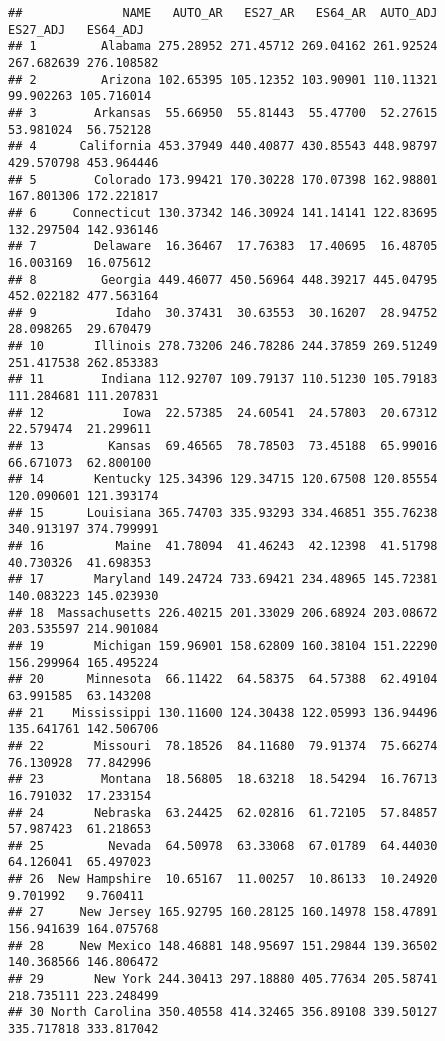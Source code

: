 \documentclass[
]{article}
\begin{document}
\begin{verbatim}
##              NAME   AUTO_AR   ES27_AR   ES64_AR  AUTO_ADJ   ES27_ADJ   ES64_ADJ
## 1         Alabama 275.28952 271.45712 269.04162 261.92524 267.682639 276.108582
## 2         Arizona 102.65395 105.12352 103.90901 110.11321  99.902263 105.716014
## 3        Arkansas  55.66950  55.81443  55.47700  52.27615  53.981024  56.752128
## 4      California 453.37949 440.40877 430.85543 448.98797 429.570798 453.964446
## 5        Colorado 173.99421 170.30228 170.07398 162.98801 167.801306 172.221817
## 6     Connecticut 130.37342 146.30924 141.14141 122.83695 132.297504 142.936146
## 7        Delaware  16.36467  17.76383  17.40695  16.48705  16.003169  16.075612
## 8         Georgia 449.46077 450.56964 448.39217 445.04795 452.022182 477.563164
## 9           Idaho  30.37431  30.63553  30.16207  28.94752  28.098265  29.670479
## 10       Illinois 278.73206 246.78286 244.37859 269.51249 251.417538 262.853383
## 11        Indiana 112.92707 109.79137 110.51230 105.79183 111.284681 111.207831
## 12           Iowa  22.57385  24.60541  24.57803  20.67312  22.579474  21.299611
## 13         Kansas  69.46565  78.78503  73.45188  65.99016  66.671073  62.800100
## 14       Kentucky 125.34396 129.34715 120.67508 120.85554 120.090601 121.393174
## 15      Louisiana 365.74703 335.93293 334.46851 355.76238 340.913197 374.799991
## 16          Maine  41.78094  41.46243  42.12398  41.51798  40.730326  41.698353
## 17       Maryland 149.24724 733.69421 234.48965 145.72381 140.083223 145.023930
## 18  Massachusetts 226.40215 201.33029 206.68924 203.08672 203.535597 214.901084
## 19       Michigan 159.96901 158.62809 160.38104 151.22290 156.299964 165.495224
## 20      Minnesota  66.11422  64.58375  64.57388  62.49104  63.991585  63.143208
## 21    Mississippi 130.11600 124.30438 122.05993 136.94496 135.641761 142.506706
## 22       Missouri  78.18526  84.11680  79.91374  75.66274  76.130928  77.842996
## 23        Montana  18.56805  18.63218  18.54294  16.76713  16.791032  17.233154
## 24       Nebraska  63.24425  62.02816  61.72105  57.84857  57.987423  61.218653
## 25         Nevada  64.50978  63.33068  67.01789  64.44030  64.126041  65.497023
## 26  New Hampshire  10.65167  11.00257  10.86133  10.24920   9.701992   9.760411
## 27     New Jersey 165.92795 160.28125 160.14978 158.47891 156.941639 164.075768
## 28     New Mexico 148.46881 148.95697 151.29844 139.36502 140.368566 146.806472
## 29       New York 244.30413 297.18880 405.77634 205.58741 218.735111 223.248499
## 30 North Carolina 350.40558 414.32465 356.89108 339.50127 335.717818 333.817042

\end{verbatim}
\end{document}
